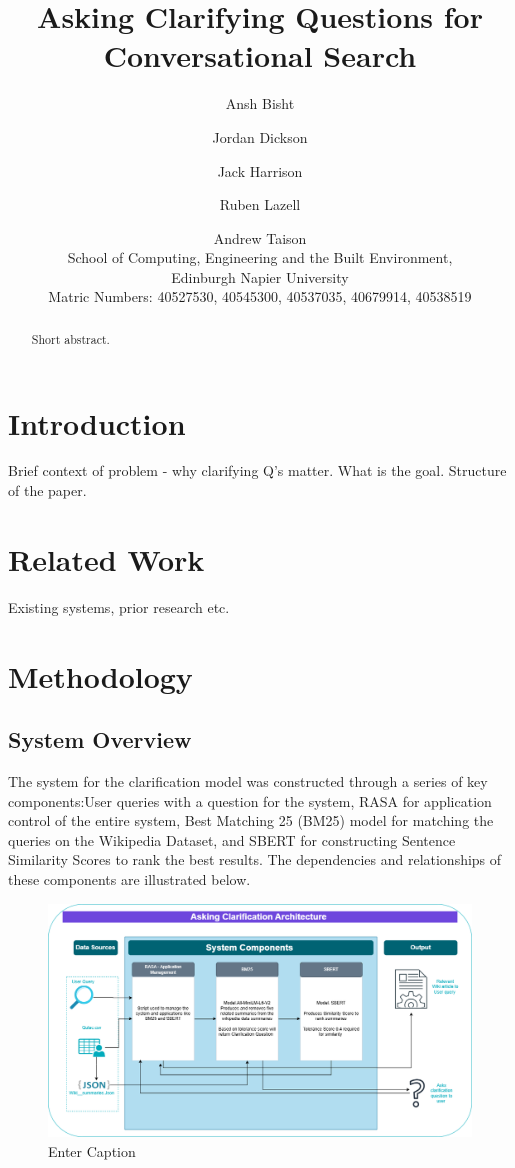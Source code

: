 \documentclass[11pt]{article}
\title{Asking Clarifying Questions for Conversational Search}
\author{
  Ansh Bisht \and
  Jordan Dickson \and
  Jack Harrison \and
  Ruben Lazell \and
  Andrew Taison  \\
  School of Computing, Engineering and the Built Environment, \\
  Edinburgh Napier University \\
  Matric Numbers: 40527530, 40545300, 40537035, 40679914, 40538519
}
\begin{document}
\maketitle
\begin{abstract}
Short abstract.
\end{abstract}


\section{Introduction}
Brief context of problem - why clarifying Q's matter.
What is the goal.
Structure of the paper.

\section{Related Work}
Existing systems, prior research etc.

\section{Methodology}



\subsection{System Overview}
The system for the clarification model was constructed through a series of key components:User queries with a question for the system, RASA for application control of the entire system, Best Matching 25 (BM25) model for matching the queries on the Wikipedia Dataset, and SBERT for constructing Sentence Similarity Scores to rank the best results. The dependencies and relationships of these components are illustrated below.

\begin{figure}[htbp]
  \includegraphics[width=\linewidth]{./img/system_diagram.png}
  \caption{Enter Caption}
  \label{fig:sys_diag}
\end{figure}
\end{document}
